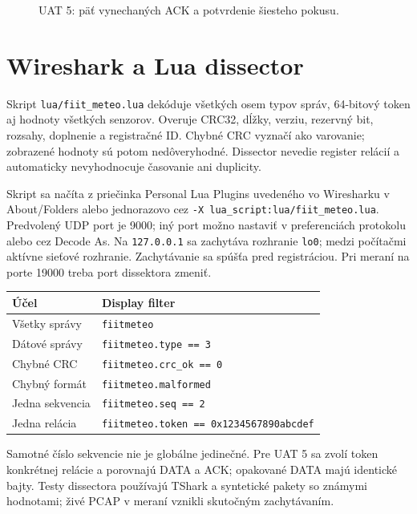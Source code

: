 \documentclass[12pt,a4paper]{article}
\begin{document}
\begin{figure}[!htbp]
\centering

\caption{UAT 5: päť vynechaných ACK a potvrdenie šiesteho pokusu.}
\end{figure}

\section{Wireshark a Lua dissector}

Skript \texttt{lua/fiit\_meteo.lua} dekóduje všetkých osem typov správ, 64-bitový token aj hodnoty všetkých senzorov. Overuje CRC32, dĺžky, verziu, rezervný bit, rozsahy, doplnenie a registračné ID. Chybné CRC vyznačí ako varovanie; zobrazené hodnoty sú potom nedôveryhodné. Dissector nevedie register relácií a automaticky nevyhodnocuje časovanie ani duplicity.

Skript sa načíta z priečinka Personal Lua Plugins uvedeného vo Wiresharku v About/Folders alebo jednorazovo cez \texttt{-X lua\_script:lua/fiit\_meteo.lua}. Predvolený UDP port je 9000; iný port možno nastaviť v preferenciách protokolu alebo cez Decode As. Na \texttt{127.0.0.1} sa zachytáva rozhranie \texttt{lo0}; medzi počítačmi aktívne sieťové rozhranie. Zachytávanie sa spúšťa pred registráciou. Pri meraní na porte 19000 treba port dissektora zmeniť.

\begin{center}\small\singlespacing
\begin{tabular}{p{5cm} p{8cm}}
\hline Účel & Display filter \\\hline
Všetky správy & \texttt{fiitmeteo} \\
Dátové správy & \texttt{fiitmeteo.type == 3} \\
Chybné CRC & \texttt{fiitmeteo.crc\_ok == 0} \\
Chybný formát & \texttt{fiitmeteo.malformed} \\
Jedna sekvencia & \texttt{fiitmeteo.seq == 2} \\
Jedna relácia & \texttt{fiitmeteo.token == 0x1234567890abcdef} \\\hline
\end{tabular}\end{center}

Samotné číslo sekvencie nie je globálne jedinečné. Pre UAT 5 sa zvolí token konkrétnej relácie a porovnajú DATA a ACK; opakované DATA majú identické bajty. Testy dissectora používajú TShark a syntetické pakety so známymi hodnotami; živé PCAP v meraní vznikli skutočným zachytávaním.
\end{document}
